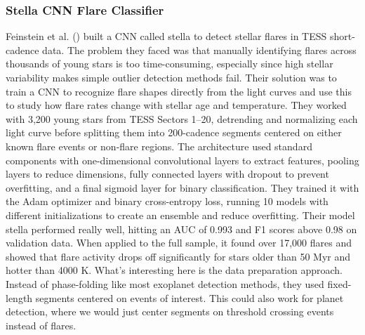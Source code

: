 \documentclass[letterpaper]{article} %
\begin{document}
\subsubsection{Stella CNN Flare Classifier}
Feinstein et al. (\citeyear{Feinstein2020stella}) built a CNN called stella to detect stellar flares in TESS short-cadence data. The problem they faced was that manually identifying flares across thousands of young stars is too time-consuming, especially since high stellar variability makes simple outlier detection methods fail. Their solution was to train a CNN to recognize flare shapes directly from the light curves and use this to study how flare rates change with stellar age and temperature. They worked with 3,200 young stars from TESS Sectors 1–20, detrending and normalizing each light curve before splitting them into 200-cadence segments centered on either known flare events or non-flare regions. The architecture used standard components with one-dimensional convolutional layers to extract features, pooling layers to reduce dimensions, fully connected layers with dropout to prevent overfitting, and a final sigmoid layer for binary classification. They trained it with the Adam optimizer and binary cross-entropy loss, running 10 models with different initializations to create an ensemble and reduce overfitting. Their model stella performed really well, hitting an AUC of 0.993 and F1 scores above 0.98 on validation data. When applied to the full sample, it found over 17,000 flares and showed that flare activity drops off significantly for stars older than 50 Myr and hotter than 4000 K. What's interesting here is the data preparation approach. Instead of phase-folding like most exoplanet detection methods, they used fixed-length segments centered on events of interest. This could also work for planet detection, where we would just center segments on threshold crossing events instead of flares.
\end{document}
